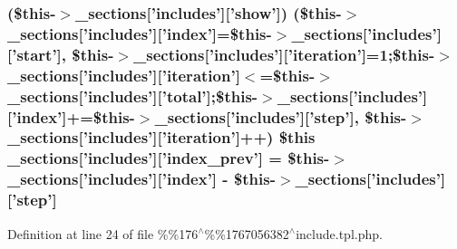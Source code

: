 {{{{{{{{{{\subsubsection[{\-\_\-sections}]{ (\$this-\/$>${\bf \-\_\-sections}\mbox{[}'includes'\mbox{]}\mbox{[}'show'\mbox{]}) (\$this-\/$>${\bf \-\_\-sections}\mbox{[}'includes'\mbox{]}\mbox{[}'index'\mbox{]}=\$this-\/$>${\bf \-\_\-sections}\mbox{[}'includes'\mbox{]}\mbox{[}'start'\mbox{]}, \$this-\/$>${\bf \-\_\-sections}\mbox{[}'includes'\mbox{]}\mbox{[}'iteration'\mbox{]}=1;\$this-\/$>${\bf \-\_\-sections}\mbox{[}'includes'\mbox{]}\mbox{[}'iteration'\mbox{]}$<$=\$this-\/$>${\bf \-\_\-sections}\mbox{[}'includes'\mbox{]}\mbox{[}'total'\mbox{]};\$this-\/$>${\bf \-\_\-sections}\mbox{[}'includes'\mbox{]}\mbox{[}'index'\mbox{]}+=\$this-\/$>${\bf \-\_\-sections}\mbox{[}'includes'\mbox{]}\mbox{[}'step'\mbox{]}, \$this-\/$>${\bf \-\_\-sections}\mbox{[}'includes'\mbox{]}\mbox{[}'iteration'\mbox{]}++) \$this {\bf \-\_\-sections}\mbox{[}'includes'\mbox{]}\mbox{[}'index\-\_\-prev'\mbox{]} = \$this-\/$>${\bf \-\_\-sections}\mbox{[}'includes'\mbox{]}\mbox{[}'index'\mbox{]} -\/ \$this-\/$>${\bf \-\_\-sections}\mbox{[}'includes'\mbox{]}\mbox{[}'step'\mbox{]}}}\label{34d6fa4bfd5eef6424a9ddc74a166350_2_06_06176_05_06_061767056382_05include_8tpl_8php_a3b2301dd250f7ac60c6a250104b183af}


\-Definition at line 24 of file \%\%176$^\wedge$\%\%1767056382$^\wedge$include.\-tpl.\-php.

\hypertarget{34d6fa4bfd5eef6424a9ddc74a166350_2_06_06176_05_06_061767056382_05include_8tpl_8php_a12a0b78e177915fb4c6e0fe1e63d0a56}{
\index{\-\_\-sections@{\-\_\-sections}!34d6fa4bfd5eef6424a9ddc74a166350/%
\subsubsection[{\-\_\-sections}]{\setlength{\rightskip}{0pt plus 5cm}\$this {\bf \-\_\-sections}\mbox{[}'includes'\mbox{]}\mbox{[}'index\-\_\-next'\mbox{]} = \$this-\/$>${\bf \-\_\-sections}\mbox{[}'includes'\mbox{]}\mbox{[}'index'\mbox{]} + \$this-\/$>${\bf \-\_\-sections}\mbox{[}'includes'\mbox{]}\mbox{[}'step'\mbox{]}}}\label{34d6fa4bfd5eef6424a9ddc74a166350_2_06_06176_05_06_061767056382_05include_8tpl_8php_a12a0b78e177915fb4c6e0fe1e63d0a56}


}}}}}}}}}}
